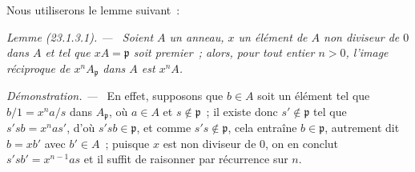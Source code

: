 \documentclass[10pt,oneside]{book}
\makeatletter
\newcommand{\setmanualcurrentlabel}[1]{\def\@currentlabel{#1}}
\newenvironment{lemma}[1][]{%
  \setmanualcurrentlabel{#1}\par\medskip\noindent\itshape Lemme (#1). ---\ }{\par}
\newenvironment{proof}{%
  \par\medskip\noindent\textit{Démonstration. ---\ }}{\par}
\makeatother
\begin{document}
Nous utiliserons le lemme suivant~:

\begin{lemma}[23.1.3.1]
\label{0.23.1.3.1-fr}
Soient $A$ un anneau, $x$ un élément de $A$ non diviseur de $0$ dans $A$ et
tel que $xA=\mathfrak p$ soit premier~; alors, pour tout entier $n>0$,
l'image réciproque de $x^nA_{\mathfrak p}$ dans $A$ est $x^nA$.
\end{lemma}

\begin{proof}
En effet, supposons que $b\in A$ soit un élément tel que
$b/1=x^na/s$ dans $A_{\mathfrak p}$, où $a\in A$ et
$s\notin\mathfrak p$~; il existe donc $s'\notin\mathfrak p$ tel que
$s'sb=x^nas'$, d'où $s'sb\in\mathfrak p$, et comme
$s's\notin\mathfrak p$, cela entraîne $b\in\mathfrak p$, autrement dit
$b=xb'$ avec $b'\in A$~; puisque $x$ est non diviseur de $0$, on en conclut
$s'sb'=x^{n-1}as$ et il suffit de raisonner par récurrence sur $n$.
\end{proof}
\end{document}
